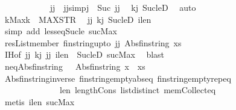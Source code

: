 \begin{isabellebody}
\ \ \ \ \ \ \ \ \ \ \isamarkupfalse%
\ jj\ \ jj{\isacharbrackleft}simp{\isacharbrackright}{\isacharcolon}{\isachardoublequoteopen}j\ {\isacharequal}\ Suc\ jj{\isachardoublequoteclose}\ \isamarkupfalse%
\ kj\ Suc{\isacharunderscore}le{\isacharunderscore}D\ \isamarkupfalse%
\ auto\isanewline
\ \ \ \ \ \ \ \ \ \ \isamarkupfalse%
\ \isamarkupfalse%
\ kMax{\isacharcolon}{\isachardoublequoteopen}k\ {\isacharless}\ MAX{\isacharunderscore}STR{\isachardoublequoteclose}\ \isamarkupfalse%
\ jj\ kj\ Suc{\isacharunderscore}le{\isacharunderscore}D\ ilen\isanewline
\ \ \ \ \ \ \ \ \ \ \ \ \isamarkupfalse%
\ {\isacharparenleft}simp\ add{\isacharcolon}\ less{\isacharunderscore}eq{\isacharunderscore}Suc{\isacharunderscore}le\ sucMax{\isacharparenright}\isanewline
\ \ \ \ \ \ \ \ \ \ \ \isamarkupfalse%
\ res{\isacharcolon}{\isachardoublequoteopen}List{\isachardot}member\ {\isacharparenleft}fin{\isacharunderscore}string{\isacharunderscore}upto\ {\isacharparenleft}jj{\isacharparenright}{\isacharparenright}\ {\isacharparenleft}Abs{\isacharunderscore}fin{\isacharunderscore}string\ xs{\isacharparenright}{\isachardoublequoteclose}\isanewline
\ \ \ \ \ \ \ \ \ \ \ \ \isamarkupfalse%
\ IH{\isacharbrackleft}of\ {\isachardoublequoteopen}jj{\isachardoublequoteclose}{\isacharbrackright}\ kj\ jj\ ilen\ \ Suc{\isacharunderscore}leD\ sucMax\ \isamarkupfalse%
\ blast\isanewline
\ \ \ \ \ \ \ \ \ \ \isamarkupfalse%
\ neq{\isacharcolon}{\isachardoublequoteopen}Abs{\isacharunderscore}fin{\isacharunderscore}string\ {\isacharbrackleft}{\isacharbrackright}\ {\isasymnoteq}\ Abs{\isacharunderscore}fin{\isacharunderscore}string\ {\isacharparenleft}x\ {\isacharhash}\ xs{\isacharparenright}{\isachardoublequoteclose}\isanewline
\ \ \ \ \ \ \ \ \ \ \ \ \isamarkupfalse%
\ Abs{\isacharunderscore}fin{\isacharunderscore}string{\isacharunderscore}inverse\ fin{\isacharunderscore}string{\isacharunderscore}empty{\isachardot}abs{\isacharunderscore}eq\ fin{\isacharunderscore}string{\isacharunderscore}empty{\isachardot}rep{\isacharunderscore}eq\ \isanewline
\ \ \ \ \ \ \ \ \ \ \ \ \ \ len\ length{\isacharunderscore}Cons\ list{\isachardot}distinct{\isacharparenleft}{}{\isacharparenright}\ mem{\isacharunderscore}Collect{\isacharunderscore}eq\isanewline
\ \ \ \ \ \ \ \ \ \ \ \ \isamarkupfalse%
\ {\isacharparenleft}metis\ ilen\ sucMax{\isacharparenright}\isanewline
\ \ \ \ \ \ \ \ \ \ \isamarkupfalse%

\end{isabellebody}
